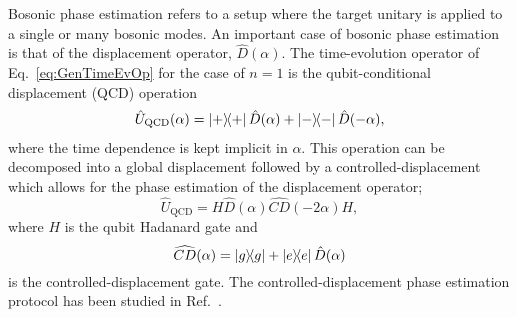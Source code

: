  {Bosonic phase estimation refers to a setup where the target unitary is applied to a single or many bosonic modes. An important case of bosonic phase estimation is that of the displacement operator, $\hat{D}(\alpha)$. {The time-evolution operator of Eq.~\eqref{eq:GenTimeEvOp} for the case of $n=1$ is the qubit-conditional displacement (QCD) operation \begin{align}
     \hat{U}_{\text{QCD}}(\alpha)=\dyad{+}\hat{D}(\alpha) + \dyad{-}\hat{D}(-\alpha),
 \end{align} where the time dependence is kept implicit in $\alpha$.} This operation can be decomposed into a global displacement followed by a controlled-displacement which allows for the phase estimation of the displacement operator; 
 $$\hat{U}_{\text{QCD}}=H\hat{D}(\alpha)\widehat{CD}(-2\alpha)H,$$where $H$ is the qubit Hadanard gate and $$\widehat{CD}(\alpha)=\dyad{g}+\dyad{e}\hat{D}(\alpha)$$ is the controlled-displacement gate. The controlled-displacement phase estimation protocol has been studied in Ref.~\cite{PhaseEstimationTerhal1}.}

